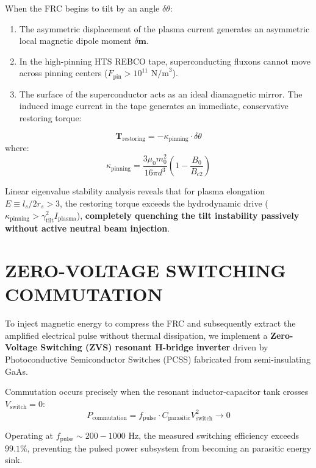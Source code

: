 \documentclass[10pt,twocolumn]{article}
\begin{document}
When the FRC begins to tilt by an angle $\delta \theta$:
\begin{enumerate}
  \item The asymmetric displacement of the plasma current generates an asymmetric local magnetic dipole moment $\delta \mathbf{m}$.
  \item In the high-pinning HTS REBCO tape, superconducting fluxons cannot move across pinning centers ($F_{\text{pin}} > 10^{11}\text{ N/m}^3$).
  \item The surface of the superconductor acts as an ideal diamagnetic mirror. The induced image current in the tape generates an immediate, conservative restoring torque:
\end{enumerate}
\begin{equation}
  \mathbf{T}_{\text{restoring}} = -\kappa_{\text{pinning}} \cdot \delta \theta
\end{equation}
where:
\begin{equation}
  \kappa_{\text{pinning}} = \frac{3\mu_0 m_0^2}{16\pi d^3} \left( 1 - \frac{B_0}{B_{c2}} \right)
\end{equation}

Linear eigenvalue stability analysis reveals that for plasma elongation $E \equiv l_s / 2r_s > 3$, the restoring torque exceeds the hydrodynamic drive ($\kappa_{\text{pinning}} > \gamma_{\text{tilt}}^2 I_{\text{plasma}}$), \textbf{completely quenching the tilt instability passively without active neutral beam injection}.



\section{ZERO-VOLTAGE SWITCHING COMMUTATION}

To inject magnetic energy to compress the FRC and subsequently extract the amplified electrical pulse without thermal dissipation, we implement a \textbf{Zero-Voltage Switching (ZVS) resonant H-bridge inverter} driven by Photoconductive Semiconductor Switches (PCSS) fabricated from semi-insulating GaAs.

Commutation occurs precisely when the resonant inductor-capacitor tank crosses $V_{\text{switch}} = 0$:
\begin{equation}
  P_{\text{commutation}} = f_{\text{pulse}} \cdot C_{\text{parasitic}} V_{\text{switch}}^2 \to 0
\end{equation}

Operating at $f_{\text{pulse}} \sim 200 - 1000\text{ Hz}$, the measured switching efficiency exceeds $99.1\%$, preventing the pulsed power subsystem from becoming an parasitic energy sink.
\end{document}
